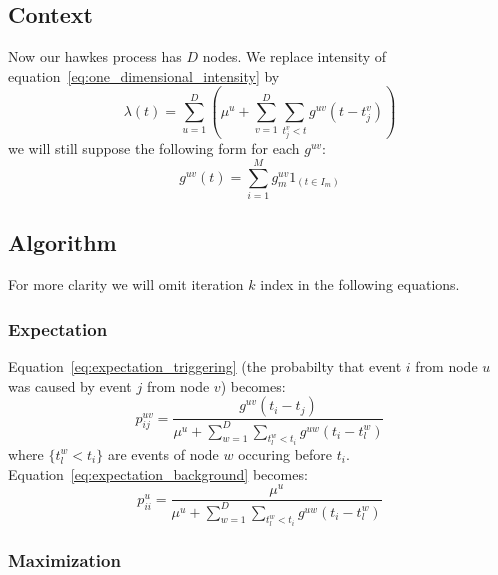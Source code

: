 \documentclass[a4paper]{article}
\begin{document}
\subsection{Context} %
\label{sub:multi_context}

Now our hawkes process has $D$ nodes. We replace intensity of equation~\ref{eq:one_dimensional_intensity} by
\begin{equation}
\label{eq:multi_dimensional_intensity}
	\lambda(t) = \sum_{u=1}^{D} \left( \mu^u + \sum_{v=1}^{D} \sum_{t_j^v < t} g^{uv}(t - t_j^v) \right)
\end{equation}
we will still suppose the following form for each $g^{uv}$:
\[
	g^{uv}(t) = \sum_{i=1}^{M} g_m^{uv} 1_{(t \in I_m)}
\]


\subsection{Algorithm} %
\label{sub:multi_algorithm}

For more clarity we will omit iteration $k$ index in the following equations.

\subsubsection{Expectation} %
\label{ssub:multi_expectation}

Equation~\ref{eq:expectation_triggering} (the probabilty that event $i$ from node $u$ was caused by event $j$ from node $v$) becomes:
\begin{equation}
	\label{eq:multi_expectation_triggering}
	p_{ij}^{uv} = \frac{g^{uv}(t_i - t_j)}{\mu^u + \sum_{w = 1}^{D} \sum_{t_l^w < t_i} g^{uw}(t_i - t_l^w)}
\end{equation}
where $\{t_l^w < t_i\}$ are events of node $w$ occuring before $t_i$. Equation~\ref{eq:expectation_background} becomes:
\begin{equation}
	\label{eq:multi_expectation_background}
	p_{ii}^{u} = \frac{\mu^u}{\mu^u + \sum_{w = 1}^{D} \sum_{t_l^w < t_i} g^{uw}(t_i - t_l^w)}
\end{equation}

\subsubsection{Maximization} %
\label{ssub:multi_maximization}
\end{document}
